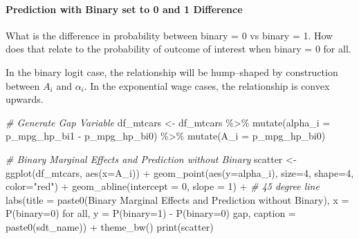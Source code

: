 \documentclass[
]{book}
\newenvironment{Shaded}{\begin{snugshade}}{\end{snugshade}}
\newcommand{\AttributeTok}[1]{\textcolor[rgb]{0.77,0.63,0.00}{#1}}
\newcommand{\CommentTok}[1]{\textcolor[rgb]{0.56,0.35,0.01}{\textit{#1}}}
\newcommand{\DecValTok}[1]{\textcolor[rgb]{0.00,0.00,0.81}{#1}}
\newcommand{\FunctionTok}[1]{\textcolor[rgb]{0.00,0.00,0.00}{#1}}
\newcommand{\NormalTok}[1]{#1}
\newcommand{\OtherTok}[1]{\textcolor[rgb]{0.56,0.35,0.01}{#1}}
\newcommand{\SpecialCharTok}[1]{\textcolor[rgb]{0.00,0.00,0.00}{#1}}
\newcommand{\StringTok}[1]{\textcolor[rgb]{0.31,0.60,0.02}{#1}}
\begin{document}
\hypertarget{prediction-with-binary-set-to-0-and-1-difference}{%
\paragraph{Prediction with Binary set to 0 and 1 Difference}\label{prediction-with-binary-set-to-0-and-1-difference}}

What is the difference in probability between binary = 0 vs binary = 1. How does that relate to the probability of outcome of interest when binary = 0 for all.

In the binary logit case, the relationship will be hump--shaped by construction between \(A_i\) and \(\alpha_i\). In the exponential wage cases, the relationship is convex upwards.

\begin{Shaded}
\begin{Highlighting}[]
\CommentTok{\# Generate Gap Variable}
\NormalTok{df\_mtcars }\OtherTok{\textless{}{-}}\NormalTok{ df\_mtcars }\SpecialCharTok{\%\textgreater{}\%} \FunctionTok{mutate}\NormalTok{(}\AttributeTok{alpha\_i =}\NormalTok{ p\_mpg\_hp\_bi1 }\SpecialCharTok{{-}}\NormalTok{ p\_mpg\_hp\_bi0) }\SpecialCharTok{\%\textgreater{}\%}
                \FunctionTok{mutate}\NormalTok{(}\AttributeTok{A\_i =}\NormalTok{ p\_mpg\_hp\_bi0)}

\CommentTok{\# Binary Marginal Effects and Prediction without Binary}
\NormalTok{scatter }\OtherTok{\textless{}{-}} \FunctionTok{ggplot}\NormalTok{(df\_mtcars, }\FunctionTok{aes}\NormalTok{(}\AttributeTok{x=}\NormalTok{A\_i)) }\SpecialCharTok{+}
      \FunctionTok{geom\_point}\NormalTok{(}\FunctionTok{aes}\NormalTok{(}\AttributeTok{y=}\NormalTok{alpha\_i), }\AttributeTok{size=}\DecValTok{4}\NormalTok{, }\AttributeTok{shape=}\DecValTok{4}\NormalTok{, }\AttributeTok{color=}\StringTok{"red"}\NormalTok{) }\SpecialCharTok{+}
      \FunctionTok{geom\_abline}\NormalTok{(}\AttributeTok{intercept =} \DecValTok{0}\NormalTok{, }\AttributeTok{slope =} \DecValTok{1}\NormalTok{) }\SpecialCharTok{+} \CommentTok{\# 45 degree line}
      \FunctionTok{labs}\NormalTok{(}\AttributeTok{title =} \FunctionTok{paste0}\NormalTok{(}\StringTok{\textquotesingle{}Binary Marginal Effects and Prediction without Binary\textquotesingle{}}\NormalTok{),}
           \AttributeTok{x =} \StringTok{\textquotesingle{}P(binary=0) for all\textquotesingle{}}\NormalTok{,}
           \AttributeTok{y =} \StringTok{\textquotesingle{}P(binary=1) {-} P(binary=0) gap\textquotesingle{}}\NormalTok{,}
           \AttributeTok{caption =} \FunctionTok{paste0}\NormalTok{(sdt\_name)) }\SpecialCharTok{+}
      \FunctionTok{theme\_bw}\NormalTok{()}
\FunctionTok{print}\NormalTok{(scatter)}
\end{Highlighting}
\end{Shaded}
\end{document}
